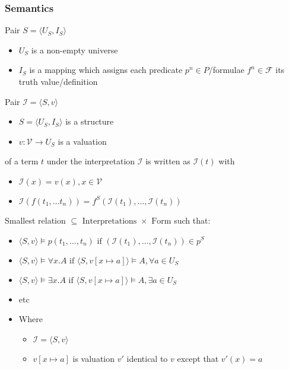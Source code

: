 \subsubsection{Semantics}
\begin{itemize}
     Pair $S = \langle U_S, I_S \rangle$
        \begin{itemize}
            \item $U_S$ is a non-empty universe
            \item $I_S$ is a mapping which assigns each predicate $p^n \in P$/formulae $f^n \in \mathcal{F}$ its truth value/definition
        \end{itemize}
     Pair $\mathcal{I} = \langle S, v \rangle$
        \begin{itemize}
            \item $S = \langle U_S, I_S \rangle$ is a structure
            \item $v : \mathcal{V} \to U_S$ is a valuation
        \end{itemize}
         of a term $t$ under the interpretation $\mathcal{I}$ is written as $\mathcal{I}(t)$ with
            \begin{itemize}
                \item $\mathcal{I}(x) = v(x), x \in \mathcal{V}$
                \item $\mathcal{I}(f(t_1, \dots t_n)) = f^S(\mathcal{I}(t_1), \dots , \mathcal{I}(t_n))$
            \end{itemize}
     Smallest relation $\subseteq \text{ Interpretations } \times \text{ Form}$ such that:
        \begin{itemize}
            \item $\langle S, v \rangle \models p(t_1, \dots , t_n) \text{ if } (\mathcal{I}(t_1), \dots , \mathcal{I}(t_n)) \in p^S$
            \item $\langle S, v \rangle \models \forall x. A \text{ if } \langle S, v[x \mapsto a] \rangle \models A, \forall a \in U_S$
            \item $\langle S, v \rangle \models \exists x. A \text{ if } \langle S, v[x \mapsto a] \rangle \models A, \exists a \in U_S$
            \item etc
            \item Where
                \begin{itemize}
                    \item $\mathcal{I} = \langle S, v \rangle$
                    \item $v[x \mapsto a]$ is valuation $v'$ identical to $v$ except that $v'(x) = a$

\end{itemize}
\end{itemize}
\end{itemize}
